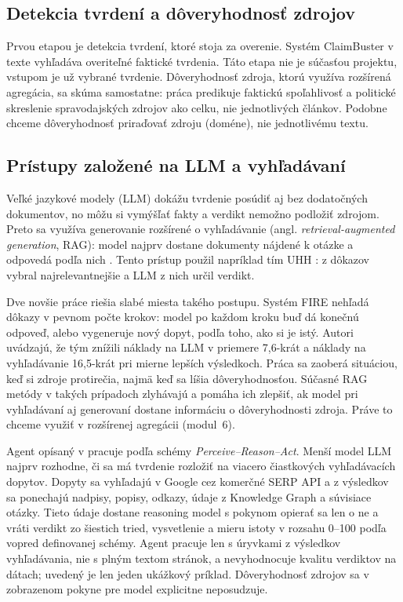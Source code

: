 \documentclass[a4paper,11pt]{article}
\begin{document}
\subsection{Detekcia tvrdení a dôveryhodnosť zdrojov}

Prvou etapou je detekcia tvrdení, ktoré stoja za overenie. Systém
ClaimBuster \cite{hassan2017claimbuster} v texte vyhľadáva overiteľné
faktické tvrdenia. Táto etapa nie je súčasťou projektu, vstupom je už
vybrané tvrdenie. Dôveryhodnosť zdroja, ktorú využíva rozšírená agregácia,
sa skúma samostatne: práca \cite{baly2018factuality} predikuje
faktickú spoľahlivosť a politické skreslenie spravodajských zdrojov ako
celku, nie jednotlivých článkov. Podobne chceme dôveryhodnosť priraďovať
zdroju (doméne), nie jednotlivému textu.

\subsection{Prístupy založené na LLM a vyhľadávaní}

Veľké jazykové modely (LLM) dokážu tvrdenie posúdiť aj bez dodatočných
dokumentov, no môžu si vymýšľať fakty a verdikt nemožno podložiť zdrojom.
Preto sa využíva generovanie rozšírené o vyhľadávanie (angl.
\textit{retrieval-augmented generation}, RAG): model najprv dostane
dokumenty nájdené k otázke a odpovedá podľa nich \cite{lewis2020rag}. Tento
prístup použil napríklad tím UHH : z dôkazov vybral
najrelevantnejšie a LLM z nich určil verdikt\cite{sevgili2024uhh}.

Dve novšie práce riešia slabé miesta takého postupu. Systém FIRE
\cite{xie2024fire} nehľadá dôkazy v pevnom počte krokov: model po každom
kroku buď dá konečnú odpoveď, alebo vygeneruje nový dopyt, podľa toho, ako
si je istý. Autori uvádzajú, že tým znížili náklady na LLM v priemere
7,6-krát a náklady na vyhľadávanie 16,5-krát pri mierne lepších výsledkoch.
Práca \cite{ge2025conflicting} sa zaoberá situáciou, keď si zdroje
protirečia, najmä keď sa líšia dôveryhodnosťou. Súčasné RAG metódy v takých
prípadoch zlyhávajú a pomáha ich zlepšiť, ak model pri vyhľadávaní aj
generovaní dostane informáciu o dôveryhodnosti zdroja. Práve to chceme
využiť v rozšírenej agregácii (modul~6).


Agent opísaný v \cite{nath-agent} pracuje podľa schémy
\textit{Perceive--Reason--Act}. Menší model LLM najprv rozhodne, či sa má
tvrdenie rozložiť na viacero čiastkových vyhľadávacích dopytov. Dopyty sa
vyhľadajú v Google cez komerčné SERP API a z výsledkov sa ponechajú
nadpisy, popisy, odkazy, údaje z Knowledge Graph a súvisiace otázky. Tieto
údaje dostane reasoning model s pokynom opierať sa len o ne a vráti verdikt
zo šiestich tried, vysvetlenie a mieru istoty v rozsahu 0--100 podľa vopred
definovanej schémy. Agent pracuje len s úryvkami z výsledkov vyhľadávania,
nie s plným textom stránok, a nevyhodnocuje kvalitu verdiktov na dátach;
uvedený je len jeden ukážkový príklad. Dôveryhodnosť zdrojov sa
v zobrazenom pokyne pre model explicitne neposudzuje.
\end{document}
